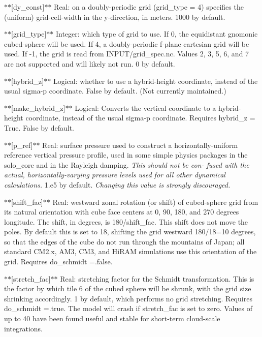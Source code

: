 $\ast$$\ast$\mbox{[}dy\-\_\-const\mbox{]}$\ast$$\ast$ Real\-: on a doubly-\/periodic grid (grid\-\_\-type = 4) specifies the (uniform) grid-\/cell-\/width in the y-\/direction, in meters. 1000 by default.

$\ast$$\ast$\mbox{[}grid\-\_\-type\mbox{]}$\ast$$\ast$ Integer\-: which type of grid to use. If 0, the equidistant gnomonic cubed-\/sphere will be used. If 4, a doubly-\/periodic f-\/plane cartesian grid will be used. If -\/1, the grid is read from I\-N\-P\-U\-T/grid\-\_\-spec.\-nc. Values 2, 3, 5, 6, and 7 are not supported and will likely not run. 0 by default.

$\ast$$\ast$\mbox{[}hybrid\-\_\-z\mbox{]}$\ast$$\ast$ Logical\-: whether to use a hybrid-\/height coordinate, instead of the usual sigma-\/p coordinate. False by default. (Not currently maintained.)

$\ast$$\ast$\mbox{[}make\-\_\-hybrid\-\_\-z\mbox{]}$\ast$$\ast$ Logical\-: Converts the vertical coordinate to a hybrid-\/height coordinate, instead of the usual sigma-\/p coordinate. Requires hybrid\-\_\-z = True. False by default.

$\ast$$\ast$\mbox{[}p\-\_\-ref\mbox{]}$\ast$$\ast$ Real\-: surface pressure used to construct a horizontally-\/uniform reference vertical pressure profile, used in some simple physics packages in the solo\-\_\-core and in the Rayleigh damping. {\itshape This should not be con-\/ fused with the actual, horizontally-\/varying pressure levels used for all other dynamical calculations.} 1.\-e5 by default. {\itshape Changing this value is strongly discouraged.}

$\ast$$\ast$\mbox{[}shift\-\_\-fac\mbox{]}$\ast$$\ast$ Real\-: westward zonal rotation (or shift) of cubed-\/sphere grid from its natural orientation with cube face centers at 0, 90, 180, and 270 degrees longitude. The shift, in degrees, is 180/shift\-\_\-fac. This shift does not move the poles. By default this is set to 18, shifting the grid westward 180/18=10 degrees, so that the edges of the cube do not run through the mountains of Japan; all standard C\-M2.\-x, A\-M3, C\-M3, and Hi\-R\-A\-M simulations use this orientation of the grid. Requires do\-\_\-schmidt =.false.

$\ast$$\ast$\mbox{[}stretch\-\_\-fac\mbox{]}$\ast$$\ast$ Real\-: stretching factor for the Schmidt transformation. This is the factor by which tile 6 of the cubed sphere will be shrunk, with the grid size shrinking accordingly. 1 by default, which performs no grid stretching. Requires do\-\_\-schmidt =.true. The model will crash if stretch\-\_\-fac is set to zero. Values of up to 40 have been found useful and stable for short-\/term cloud-\/scale integrations.

